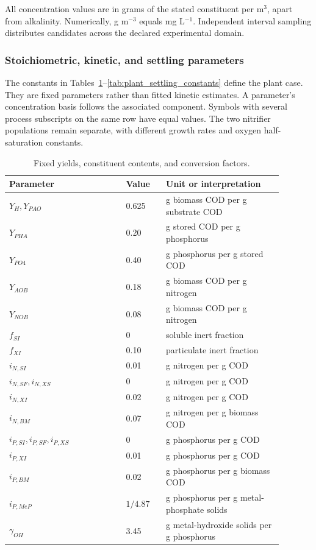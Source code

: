 All concentration values are in grams of the stated constituent per m$^3$, apart from alkalinity. Numerically, g m$^{-3}$ equals mg L$^{-1}$. Independent interval sampling distributes candidates across the declared experimental domain.

\subsubsection{Stoichiometric, kinetic, and settling parameters}

The constants in Tables~\ref{tab:plant_stoichiometric_constants}--\ref{tab:plant_settling_constants} define the plant case. They are fixed parameters rather than fitted kinetic estimates. A parameter's concentration basis follows the associated component. Symbols with several process subscripts on the same row have equal values. The two nitrifier populations remain separate, with different growth rates and oxygen half-saturation constants.

\begin{table}[htbp]
\centering\small
\caption{Fixed yields, constituent contents, and conversion factors.}\label{tab:plant_stoichiometric_constants}
\begin{tabular}{p{0.38\linewidth}p{0.13\linewidth}p{0.38\linewidth}}
\toprule Parameter & Value & Unit or interpretation\\\midrule
$Y_H,Y_{PAO}$ & 0.625 & g biomass COD per g substrate COD\\
$Y_{PHA}$ & 0.20 & g stored COD per g phosphorus\\
$Y_{PO4}$ & 0.40 & g phosphorus per g stored COD\\
$Y_{AOB}$ & 0.18 & g biomass COD per g nitrogen\\
$Y_{NOB}$ & 0.08 & g biomass COD per g nitrogen\\
$f_{SI}$ & 0 & soluble inert fraction\\
$f_{XI}$ & 0.10 & particulate inert fraction\\
$i_{N,SI}$ & 0.01 & g nitrogen per g COD\\
$i_{N,SF},i_{N,XS}$ & 0 & g nitrogen per g COD\\
$i_{N,XI}$ & 0.02 & g nitrogen per g COD\\
$i_{N,BM}$ & 0.07 & g nitrogen per g biomass COD\\
$i_{P,SI},i_{P,SF},i_{P,XS}$ & 0 & g phosphorus per g COD\\
$i_{P,XI}$ & 0.01 & g phosphorus per g COD\\
$i_{P,BM}$ & 0.02 & g phosphorus per g biomass COD\\
$i_{P,MeP}$ & $1/4.87$ & g phosphorus per g metal-phosphate solids\\
$\gamma_{OH}$ & 3.45 & g metal-hydroxide solids per g phosphorus\\
\bottomrule
\end{tabular}
\end{table}

